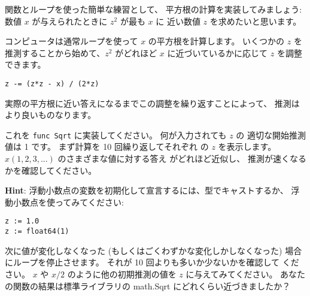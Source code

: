 関数とループを使った簡単な練習として、
平方根の計算を実装してみましょう: 
数値 $x$ が与えられたときに $z^2$ が最も $x$ に
近い数値 $z$ を求めたいと思います。

コンピュータは通常ループを使って $x$ の平方根を計算します。
いくつかの $z$ を推測することから始めて、$z^2$ がどれほど
$x$ に近づいているかに応じて $z$ を調整できます。

\begin{lstlisting}[numbers=none]
z -= (z*z - x) / (2*z)
\end{lstlisting}

実際の平方根に近い答えになるまでこの調整を繰り返すことによって、
推測はより良いものなります。

これを \texttt{func Sqrt} に実装してください。 何が入力されても $z$ の
適切な開始推測値は 1 です。 まず計算を 10 回繰り返してそれぞれ
の $z$ を表示します。 $x (1, 2, 3, ...)$ のさまざまな値に対する答え
がどれほど近似し、 推測が速くなるかを確認してください。

\textbf{Hint}: 浮動小数点の変数を初期化して宣言するには、型でキャストするか、
浮動小数点を使ってみてください:

\begin{lstlisting}[numbers=none]
z := 1.0
z := float64(1)
\end{lstlisting}

次に値が変化しなくなった (もしくはごくわずかな変化しかしなくなった) 
場合にループを停止させます。 それが 10 回よりも多いか少ないかを確認して
ください。 $x$ や $x/2$ のように他の初期推測の値を $z$ に与えてみてください。
あなたの関数の結果は標準ライブラリの math.Sqrt にどれくらい近づきましたか？